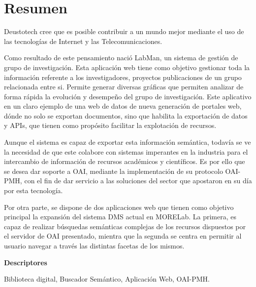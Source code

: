\chapter*{Resumen}

Deustotech cree que es posible contribuir a un mundo mejor mediante el uso de
las tecnologías de Internet y las Telecomunicaciones.

Como resultado de este pensamiento nació LabMan, un sistema de gestión de grupo
de investigación. Esta aplicación web tiene como objetivo gestionar toda la
información referente a los investigadores, proyectos publicaciones de un grupo
relacionada entre si. Permite generar diversas gráficas que permiten analizar de
forma rápida la evolución y desempeño del grupo de investigación.
Este aplicativo en un claro ejemplo de una web de datos de nueva generación de
portales web, dónde no solo se exportan documentos, sino que habilita la
exportación de datos y APIs, que tienen como propósito facilitar la explotación
de recursos.

Aunque el sistema es capaz de exportar esta información semántica, todavía se ve
la necesidad de que este colabore con  sistemas imperantes en la industria para
el intercambio de información de recursos académicos y científicos.
Es por ello que se desea dar soporte a OAI, mediante la implementación de su
protocolo OAI-PMH, con el fin de dar servicio a las soluciones del sector que
apostaron en su día por esta tecnología.

Por otra parte, se dispone de dos aplicaciones web que tienen como objetivo
principal la expansión del sistema DMS actual en MORELab. La primera, es capaz
de realizar búsquedas semánticas complejas de los recursos dispuestos por el
servidor de OAI presentado, mientra que la segunda se centra en permitir al
usuario navegar a través las distintas facetas de los mismos.

\vspace{2em}

{\Large\bfseries\sectionfont Descriptores}
\vspace{3\medskipamount}

Biblioteca digital, Buscador Semántico, Aplicación Web, OAI-PMH.